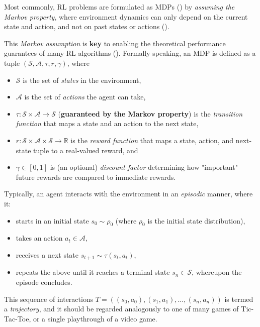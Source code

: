 \documentclass{article} %
\theoremstyle{definition}
\begin{document}
Most commonly, RL problems are formulated as MDPs
(\cite{SpinningUp-2018, Levine-et-al-2023, Sutton-and-Barto-1998})
by \textit{assuming the Markov property}, where environment dynamics
can only depend on the current state and action, and not on past states or actions (\cite{Sutton-and-Barto-1998}).

This \textit{Markov assumption} is \textbf{key} to 
enabling the theoretical performance guarantees of many RL algorithms (\cite{Sutton-and-Barto-1998}).
Formally speaking, an MDP is defined as a tuple $(\mathcal{S}, \mathcal{A}, \tau, r, \gamma)$, 
where 

\begin{itemize}
    \item $\mathcal{S}$ is the set of \textit{states} in the environment,
    \item $\mathcal{A}$ is the set of \textit{actions} the agent can take,
    \item $\tau: \mathcal{S} \times \mathcal{A} \rightarrow \mathcal{S}$ (\textbf{guaranteed by the Markov property}) 
          is the \textit{transition function}
          that maps a state and an action to the next state,
    \item $r: \mathcal{S} \times \mathcal{A} \times \mathcal{S} \rightarrow \mathbb{R}$ is the \textit{reward function} 
          that maps a state, action, and next-state tuple to a real-valued reward, and
    \item $\gamma \in [0, 1]$ is (an optional) \textit{discount factor} determining 
          how "important" future rewards are compared to immediate rewards.
\end{itemize}

Typically, an agent interacts with the environment in an \textit{episodic} manner, 
where it:

\begin{itemize}
    \item starts in an initial state $s_0 \sim \rho_0$ (where $\rho_0$ is the initial state distribution),
    \item takes an action $a_t \in \mathcal{A}$,
    \item receives a next state $s_{t+1} \sim \tau(s_t, a_t)$,
    \item repeats the above until it reaches a terminal state $s_n \in \mathcal{S}$, whereupon the episode concludes.
\end{itemize}
This sequence of interactions $T = ((s_0, a_0), (s_1, a_1), \ldots, (s_n, a_n))$
is termed a \textit{trajectory}, and it should be regarded analogously to one
of many games of Tic-Tac-Toe, or a single playthrough of a video game.
\end{document}

